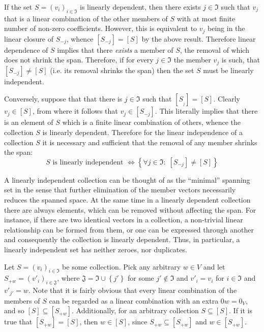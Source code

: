 \documentclass[a4paper]{article}
\newcommand{\obj}[1]{\ensuremath{\left\{ #1 \right\}}}
\newcommand{\brac}[1]{\ensuremath{\left( #1 \right)}}
\newcommand{\spn}[1]{\ensuremath{\left[ #1 \right]}}
\begin{document}
If the set $S=\brac{v_i}_{i\in\mathfrak{I}}$ is linearly dependent, then there exists $j\in\mathfrak{I}$ such that $v_j$ that is a linear combination of the other members of $S$ with at most finite number of non-zero coefficients. However, this is equivalent to $v_j$ being in the linear closure of $S_{-j}$, whence $\spn{S_{-j}} = \spn{S}$ by the above result. Therefore linear dependence of $S$ implies that there \emph{exists} a member of $S$, the removal of which does not shrink the span. Therefore, if for every $j\in\mathfrak{I}$ the member $v_j$ is such, that $\spn{S_{-j}} \neq \spn{S}$ (i.e. its removal shrinks the span) then the set $S$ must be linearly independent.

Conversely, suppose that that there is $j\in \mathfrak{I}$ such that $\spn{S_{_j}}=\spn{S}$. Clearly $v_j\in\spn{S}$, from where it follows that $v_j \in \spn{S_{-j}}$. This literally implies that there is an element of $S$ which is a finite linear combination of others, whence the collection $S$ is linearly dependent. Therefore for the linear independence of a collection $S$ it is necessary and sufficient that the removal of any member shrinks the span:\[S\text{ is linearly independent } \Leftrightarrow \obj{\forall{j\in \mathfrak{I}}:\;\spn{S_{-j}} \neq \spn{S}}\]

A linearly independent collection can be thought of as the ``minimal'' spanning set in the sense that further elimination of the member vectors necessarily reduces the spanned space. At the same time in a linearly dependent collection there are always elements, which can be removed without affecting the span. For instance, if there are two identical vectors in a collection, a non-trivial linear relationship can be formed from them, or one can be expressed through another and consequently the collection is linearly dependent. Thus, in particular, a linearly independent set has neither zeroes, nor duplicates.

Let $S=\brac{v_i}_{i\in\mathfrak{I}}$ be some collection. Pick any arbitrary $w\in V$ and let $S_{+w}=\brac{v'_i}_{i\in\mathfrak{J}}$, where $\mathfrak{J}=\mathfrak{I}\cup\obj{j'}$ for some $j'\notin \mathfrak{I}$ and $v'_i=v_i$ for $i\in \mathfrak{I}$ and $v'_{j'}=w$. Note that it is fairly obvious that every linear combination of the members of $S$ can be regarded as a linear combination with an extra $0 w=0_V$, and so $\spn{S} \subseteq \spn{S_{+w}}$. Additionally, for an arbitrary collection $S\subseteq \spn{S}$.
If it is true that $\spn{S_{+w}}=\spn{S}$, then $w\in \spn{S}$, since $S_{+w}\subseteq \spn{S_{+w}}$ and $w\in \spn{S_{+w}}$.
\end{document}
